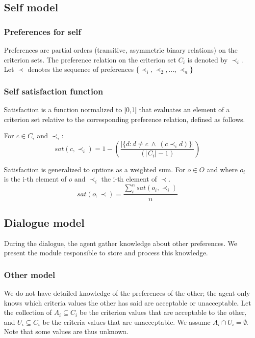 \documentclass{llncs}
\begin{document}
	\subsection{Self model} 
	
	\subsubsection{Preferences for self}
	Preferences are partial orders (transitive, asymmetric binary relations) on the criterion sets. The preference relation on the criterion set $C_i$ is denoted by $\prec_i$.			
	Let $\prec$ denotes the sequence of preferences $\{ \prec_i, \prec_2, ..., \prec_n\}$
	
	\subsubsection{Self satisfaction function} 
	
	Satisfaction is a function normalized to [0,1] that evaluates an element of a criterion set relative to the corresponding preference relation, defined as follows.
	
	For $c \in C_i$ and $\prec_i$:
	\begin{equation}
	sat(c, \prec_i) =	1 - \left( \frac{|\{d : d \neq c \  \wedge \ (c \prec_i d)\}| }{( |C_i| - 1 )}\right)
	\end{equation}
	
	
	Satisfaction is generalized to options as a weighted sum.
	For $o \in O$ and where $o_i$ is the i-th element of $o$ and $\prec_i$ the i-th element of $\prec$.
	\begin{equation}
	sat(o, \prec) = \frac{\sum_{i}^{n} sat(o_i, \prec_i) }{n}
	\end{equation}
	
	
	
	\subsection{Dialogue model}
	During the dialogue, the agent gather knowledge about other preferences. We present the module responsible to store and process this knowledge. 
	
	\subsubsection{Other model}
	We do not have detailed knowledge of the preferences of the other; the agent only knows which criteria values the other has said are acceptable or unacceptable.				
	Let the collection of $A_i \subseteq C_i$ be the criterion values that are acceptable to the other, and $U_i \subseteq C_i$ be the criteria values that are unacceptable.  We assume $A_i \cap U_i = \emptyset$.  Note	that some values are thus unknown.
	
\end{document}
